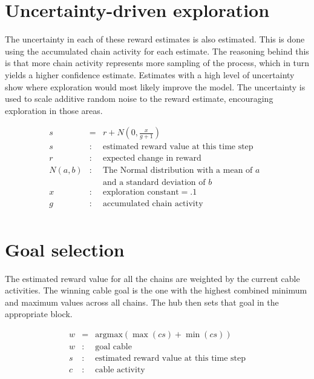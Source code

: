 \documentclass[oneside,twocolumn]{article}
\begin{document}
\section*{\color{copper} Uncertainty-driven exploration}

The uncertainty in each of these reward estimates is also estimated. This is done using the accumulated chain activity for each estimate. The reasoning behind this is that more chain activity represents more sampling of the process, which in turn yields a higher confidence estimate. 
Estimates with a high level of uncertainty show where exploration would most likely improve the model. The uncertainty is used to scale additive random noise to the reward estimate, encouraging exploration in those areas.

\begin{eqnarray*}
s &= & r + N \left ( 0, \frac{x}{g + 1} \right )\\ 
s &:& \mbox{estimated reward value at this time step} \\
r &:& \mbox{expected change in reward} \\
N(a,b) &:& \mbox{The Normal distribution with a mean of $a$ } \\
&& \mbox{and a standard deviation of $b$} \\
x &:& \mbox{exploration constant} = .1 \\
g &:& \mbox{accumulated chain activity} \\
\end{eqnarray*}

\section*{\color{copper} Goal selection}

The estimated reward value for all the chains are weighted by the current cable activities. The winning cable goal is the one with the highest combined minimum and maximum values across all chains. The hub then sets that goal in the appropriate block. 

\begin{eqnarray*}
w &= & \mbox{argmax} ( \max (cs) + \min (cs) )\\ 
w &:& \mbox{goal cable} \\
s &:& \mbox{estimated reward value at this time step} \\
c &:& \mbox{cable activity} \\
\end{eqnarray*}
\end{document}
